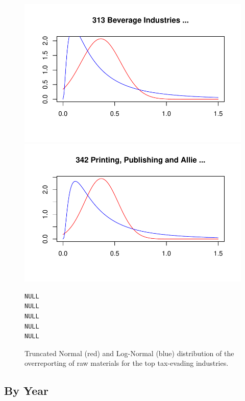 \documentclass[
  12pt]{article}
\theoremstyle{definition}
\theoremstyle{remark}
\begin{document}
\begin{figure}
\begin{minipage}{\linewidth}
\includegraphics{Tax-Prod_files/figure-pdf/unnamed-chunk-36-4.pdf}

\includegraphics{Tax-Prod_files/figure-pdf/unnamed-chunk-36-5.pdf}

\begin{verbatim}
NULL
NULL
NULL
NULL
NULL
\end{verbatim}

\end{minipage}%

\caption{\label{fig-density-plots}Truncated Normal (red) and Log-Normal
(blue) distribution of the overreporting of raw materials for the top
tax-evading industries.}

\end{figure}%

\subsection{By Year}\label{by-year}
\end{document}
